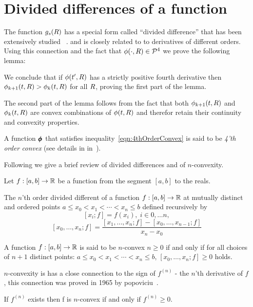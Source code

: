 \documentclass{article}[12pt]
\begin{document}
\section{Divided differences of a function} \label{sec:divdiff}

The function $g_s(R)$ has a special form called ``divided difference''
that has been extensively studied ~\cite{popoviciu1965certaines,butt2016generalization, de2005divided}.
and is closely related to to derivatives of different orders. Using
this connection and the fact that $\phi(\cdot,R) \in {\cal P}^{4}$ we prove
the following lemma:


We conclude that if $\phi(t',R)$ has a strictly positive fourth
derivative then $\phi_{k+1}(t,R) > \phi_{k}(t,R)$ for all $R$, proving
the first part of the lemma.

The second part of the lemma follows from the fact that
both $\phi_{k+1}(t,R)$ and $\phi_{k}(t,R)$ are convex combinations of
$\phi(t,R)$ and therefor retain their continuity and convexity properties.

A function $\pmb{\phi}_{}$ that satisfies
inequality~\ref{eqn:4thOrderConvex} is said to be {\em 4'th order convex}
(see details in in~\cite{butt2016generalization}).


Following\cite{butt2016generalization} we give a brief review of
divided differences and of $n$-convexity.

Let $f:[a,b] \to \mathbb{R}$ be a function from the segment $[a,b]$ to the
reals.

\begin{definition}
  The $n$'th order divided different of a function $f:[a,b] \to
  \mathbb{R}$ at mutually distinct and ordered points $a \leq x_0 < x_1
  < \cdots < x_n \leq b$
  defined recursively by
  \[ [x_i; f] = f(x_i), \; i \in 0,\ldots n,\]
  \[ [x_0,\ldots,x_n;f] =
    \frac{[x_1,\ldots,x_n;f]-[x_0,\ldots,x_{n-1};f]}{x_n-x_0} \]
\end{definition}

\begin{definition}[$n$-convexity]
 A function $f:[a,b] \to \mathbb{R}$ is said to be $n$-convex  $n \geq 0$
 if and only if for all choices of $n+1$ distinct points: $a \leq x_0 < x_1
  < \cdots < x_n \leq b$, $[x_0,\ldots,x_n;f]\geq 0$ holds.
\end{definition}
$n$-convexity is has a close connection to the sign of $f^{(n)}$ - the $n$'th
derivative of $f$, this connection was proved in 1965 by
popoviciu~\cite{popoviciu1965certaines}.
\begin{theorem} \label{thm:popo}
If $f^{(n)}$ exists then f is $n$-convex if and only if $f^{(n)}\geq 0$.
\end{theorem}
\end{document}
